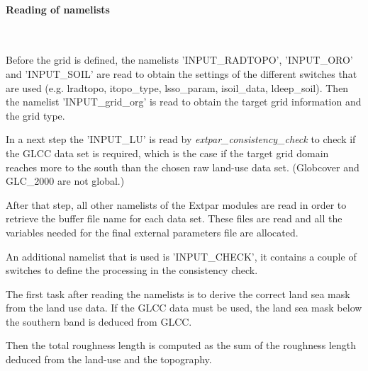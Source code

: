 \documentclass[a4paper,10pt,DIV14,BCOR1cm,titlepage,twoside]{scrartcl}
\begin{document}
\paragraph{Reading of namelists}\ \par\medskip\noindent
Before the grid is defined, the namelists 'INPUT\_RADTOPO', 'INPUT\_ORO' and 'INPUT\_SOIL' are read to obtain the settings of the different switches that are used (e.g. lradtopo, itopo\_type, lsso\_param, isoil\_data, ldeep\_soil). Then the namelist 'INPUT\_grid\_org' is read to obtain the target grid information and the grid type.\par\medskip\noindent
In a next step the 'INPUT\_LU' is read by \textit{extpar\_consistency\_check} to check if the GLCC data set is required, which is the case if the target grid domain reaches more to the south than the chosen raw land-use data set. (Globcover and GLC\_2000 are not global.)\par\medskip\noindent
After that step, all other namelists of the Extpar modules are read in order to retrieve the buffer file name for each data set. These files are read and all the variables needed for the final external parameters file are allocated. \par\medskip\noindent\par\medskip\noindent
An additional namelist that is used is 'INPUT\_CHECK', it contains a couple of switches to define the processing in the consistency check. \par\medskip\noindent
The first task after reading the namelists is to derive the correct land sea mask from the land use data. If the GLCC data must be used, the land sea mask below the southern band is deduced from GLCC.\par\medskip\noindent
Then the total roughness length is computed as the sum of the roughness length deduced from the land-use and the topography.\par\medskip\noindent
\end{document}

